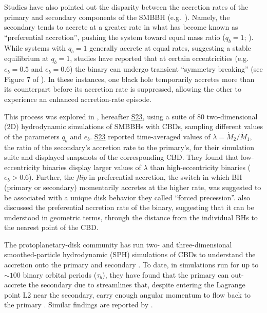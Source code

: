 \documentclass[fleqn,usenatbib]{mnras}
\newcommand{\Stwentythree}{\href{https://doi.org/10.1093/mnras/stac3263}{S23}\xspace}
\begin{document}
Studies have also pointed out the disparity between the accretion rates of the primary and secondary components of the SMBBH (e.g.\ \citealt{Dorazio+2013, miranda_munoz_lai_2017, siwek_prefacc, Dorazio_24_pref_mention}). Namely, the secondary tends to accrete at a greater rate in what has become known as ``preferential accretion'', pushing the system toward equal mass ratio ($q_b = 1$; \citealt{dorazio_2013, farris_2014, duffell_dorazio_2020, miranda_munoz_lai_2017, siwek_prefacc}). While systems with $q_b = 1$ generally accrete at equal rates, suggesting a stable equilibrium at $q_b = 1$, studies have reported that at certain eccentricities (e.g.\ $e_b = 0.5$ and $e_b = 0.6$) the binary can undergo transient ``symmetry breaking'' (see Figure 7 of \citealt{munoz_miranda_lai_19}). In these instances, one black hole temporarily accretes more than its counterpart before its accretion rate is suppressed, allowing the other to experience an enhanced accretion-rate episode.


This process was explored in \citealt{siwek_prefacc}, hereafter \Stwentythree, using a suite of $80$ two-dimensional (2D) hydrodynamic simulations of SMBBHs with CBDs, sampling different values of the parameters $q_b$ and $e_b$. \Stwentythree reported time-averaged values of $\lambda = \dot{M}_2/\dot{M}_1$, the ratio of the secondary's accretion rate to the primary's, for their simulation suite and displayed snapshots of the corresponding CBD. They found that low-eccentricity binaries display larger values of $\lambda$ than high-eccentricity binaries ($e_b > 0.6$). Further, the \textit{flip} in preferential accretion, the switch in which BH (primary or secondary) momentarily accretes at the higher rate, was suggested to be associated with a unique disk behavior they called ``forced precession''. \citet{DeLaurentiis24} also discussed the preferential accretion rate of the binary, suggesting that it can be understood in geometric terms, through the distance from the individual BHs to the nearest point of the CBD.

The protoplanetary-disk community has run two- and three-dimensional smoothed-particle hydrodynamic (SPH) simulations of CBDs to understand the accretion onto the primary and secondary \citep{Gunther_Kley_02, Ochi_05, Young_15}. To date, in simulations run for up to $\sim 100$ binary orbital periods ($\tau_b$), they have found that the primary can out-accrete the secondary due to streamlines that, despite entering the Lagrange point L2 near the secondary, carry enough angular momentum to flow back to the primary \citep{Ochi_05, Young_15}. Similar findings are reported by \citet{Tiede_22}.
\end{document}
